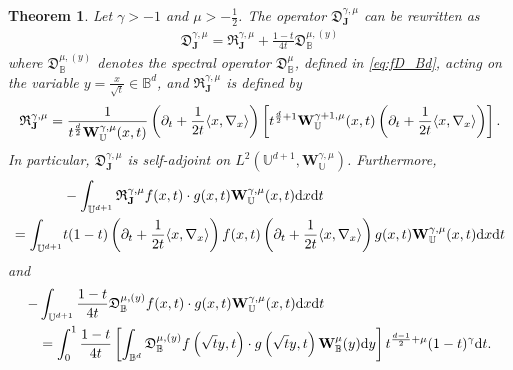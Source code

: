 \documentclass{amsart}
\newtheorem{thm}{Theorem}[section]
\theoremstyle{remark}
\def\la{{\langle}}
\def\ra{{\rangle}}
\def\d{\mathrm{d}}
\def\fD{{\mathfrak D}}
\def\fR{{\mathfrak R}}
\def\g{{\gamma}}
\def\la{{\langle}}
\def\ra{{\rangle}}
\def\Jb{{\mathbf J}}
\def\Wb{{\mathbf W}}
\def\BB{{\mathbb B}}
\def\UU{{\mathbb U}}
\def\f{\frac}
\begin{document}
\begin{thm} 
Let $\g > -1$ and $\mu > -\f12$. The operator $ \fD_{\Jb}^{\g,\mu}$ can be rewritten as
\begin{align} \label{eq:fD_UU2}
 \fD_{\Jb}^{\g,\mu} =  \fR_\Jb^{\g,\mu}  + \frac{1-t}{4t} \fD_\BB^{\mu, (y)}
\end{align}
where $\fD_\BB^{\mu, (y)}$ denotes the spectral operator $\fD_\BB^\mu$, defined in \eqref{eq:fD_Bd}, acting on 
the variable $y = \frac{x}{\sqrt{t}} \in \BB^d$, and $\fR_\Jb^{\g,\mu} $ is defined by 
\begin{align*}
 \fR_\Jb^{\g,\mu} =  \frac{1}{t^{\f d 2} \Wb_\UU^{\g,\mu}(x,t)} \left( \partial_t + \frac{1}{2t} \la x ,\nabla_x\ra \right) 
  \left[t^{\f{d}{2} +1} \Wb_\UU^{\g+1,\mu}(x,t) \left( \partial_t + \frac{1}{2t} \la x ,\nabla_x\ra \right) \right]. \notag
 \end{align*}
In particular, $\fD_\Jb^{\g,\mu}$ is self-adjoint on $L^2(\UU^{d+1}, \Wb_{\UU}^{\g,\mu})$. Furthermore, 
\begin{align}\label{eq:int_fDU1}
  &  - \int_{\UU^{d+1}} \fR_{\Jb}^{\g,\mu} f(x,t)\cdot g(x,t) \Wb_{\UU}^{\g,\mu}(x,t) \d x \d t \\
 =  \int_{\UU^{d+1}} & t(1-t)  \left( \partial_t + \frac{1}{2t} \la x ,\nabla_x\ra \right) f(x,t)  \left( \partial_t + \frac{1}{2t} \la x ,\nabla_x\ra \right) g(x,t) \Wb_{\UU}^{\g,\mu}(x,t) \d x \d t \notag
\end{align}
and
\begin{align}\label{eq:int_fDU2}
 - & \int_{\UU^{d+1}}  \frac{1-t}{4t} \fD_{\BB}^{\mu, (y)} f(x,t)\cdot g(x,t) \Wb_{\UU}^{\g,\mu}(x,t) \d x \d t \\
  & =  \int_0^1 \frac{1-t}{4t} \left[ \int_{\BB^d} \fD_\BB^{\mu, (y)} f\left(\sqrt{t} y, t\right ) \cdot g\left(\sqrt{t} y, t\right)
   \Wb_\BB^\mu (y) \d y\right]  t^{\f{d-1}{2} + \mu}(1-t)^\g \d t. \notag
\end{align}
\end{thm}
\end{document}
